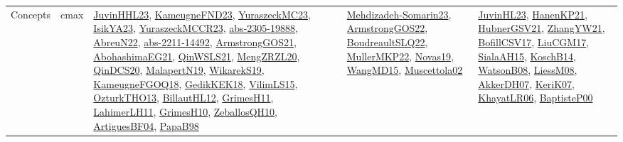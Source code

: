 {\begin{longtable}{llp{6cm}p{6cm}p{6cm}}
Concepts & cmax & \href{papers/JuvinHHL23.pdf}{JuvinHHL23}\cite{JuvinHHL23}, \href{papers/KameugneFND23.pdf}{KameugneFND23}\cite{KameugneFND23}, \href{papers/YuraszeckMC23.pdf}{YuraszeckMC23}\cite{YuraszeckMC23}, \href{articles/IsikYA23.pdf}{IsikYA23}\cite{IsikYA23}, \href{articles/YuraszeckMCCR23.pdf}{YuraszeckMCCR23}\cite{YuraszeckMCCR23}, \href{articles/abs-2305-19888.pdf}{abs-2305-19888}\cite{abs-2305-19888}, \href{articles/AbreuN22.pdf}{AbreuN22}\cite{AbreuN22}, \href{articles/abs-2211-14492.pdf}{abs-2211-14492}\cite{abs-2211-14492}, \href{papers/ArmstrongGOS21.pdf}{ArmstrongGOS21}\cite{ArmstrongGOS21}, \href{articles/AbohashimaEG21.pdf}{AbohashimaEG21}\cite{AbohashimaEG21}, \href{articles/QinWSLS21.pdf}{QinWSLS21}\cite{QinWSLS21}, \href{articles/MengZRZL20.pdf}{MengZRZL20}\cite{MengZRZL20}, \href{articles/QinDCS20.pdf}{QinDCS20}\cite{QinDCS20}, \href{papers/MalapertN19.pdf}{MalapertN19}\cite{MalapertN19}, \href{articles/WikarekS19.pdf}{WikarekS19}\cite{WikarekS19}, \href{papers/KameugneFGOQ18.pdf}{KameugneFGOQ18}\cite{KameugneFGOQ18}, \href{articles/GedikKEK18.pdf}{GedikKEK18}\cite{GedikKEK18}, \href{papers/VilimLS15.pdf}{VilimLS15}\cite{VilimLS15}, \href{articles/OzturkTHO13.pdf}{OzturkTHO13}\cite{OzturkTHO13}, \href{papers/BillautHL12.pdf}{BillautHL12}\cite{BillautHL12}, \href{papers/GrimesH11.pdf}{GrimesH11}\cite{GrimesH11}, \href{papers/LahimerLH11.pdf}{LahimerLH11}\cite{LahimerLH11}, \href{papers/GrimesH10.pdf}{GrimesH10}\cite{GrimesH10}, \href{articles/ZeballosQH10.pdf}{ZeballosQH10}\cite{ZeballosQH10}, \href{papers/ArtiguesBF04.pdf}{ArtiguesBF04}\cite{ArtiguesBF04}, \href{articles/PapaB98.pdf}{PapaB98}\cite{PapaB98} & \href{papers/Mehdizadeh-Somarin23.pdf}{Mehdizadeh-Somarin23}\cite{Mehdizadeh-Somarin23}, \href{papers/ArmstrongGOS22.pdf}{ArmstrongGOS22}\cite{ArmstrongGOS22}, \href{papers/BoudreaultSLQ22.pdf}{BoudreaultSLQ22}\cite{BoudreaultSLQ22}, \href{articles/MullerMKP22.pdf}{MullerMKP22}\cite{MullerMKP22}, \href{articles/Novas19.pdf}{Novas19}\cite{Novas19}, \href{articles/WangMD15.pdf}{WangMD15}\cite{WangMD15}, \href{papers/Muscettola02.pdf}{Muscettola02}\cite{Muscettola02} & \href{papers/JuvinHL23.pdf}{JuvinHL23}\cite{JuvinHL23}, \href{papers/HanenKP21.pdf}{HanenKP21}\cite{HanenKP21}, \href{articles/HubnerGSV21.pdf}{HubnerGSV21}\cite{HubnerGSV21}, \href{articles/ZhangYW21.pdf}{ZhangYW21}\cite{ZhangYW21}, \href{papers/BofillCSV17.pdf}{BofillCSV17}\cite{BofillCSV17}, \href{papers/LiuCGM17.pdf}{LiuCGM17}\cite{LiuCGM17}, \href{papers/SialaAH15.pdf}{SialaAH15}\cite{SialaAH15}, \href{papers/KoschB14.pdf}{KoschB14}\cite{KoschB14}, \href{papers/WatsonB08.pdf}{WatsonB08}\cite{WatsonB08}, \href{articles/LiessM08.pdf}{LiessM08}\cite{LiessM08}, \href{papers/AkkerDH07.pdf}{AkkerDH07}\cite{AkkerDH07}, \href{papers/KeriK07.pdf}{KeriK07}\cite{KeriK07}, \href{articles/KhayatLR06.pdf}{KhayatLR06}\cite{KhayatLR06}, \href{articles/BaptisteP00.pdf}{BaptisteP00}\cite{BaptisteP00}\\

\end{longtable}}
